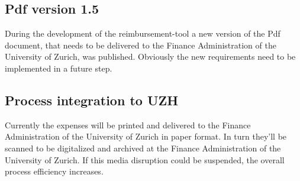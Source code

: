 \subsection{Pdf version 1.5}
During the development of the reimbursement-tool a new version of the Pdf document, that needs to be delivered to the Finance Administration of the University of Zurich, was published. Obviously the new requirements need to be implemented in a future step. 

\subsection{Process integration to UZH}
Currently the expenses will be printed and delivered to the Finance Administration of the University of Zurich in paper format. In turn they'll be scanned to be digitalized and archived at the Finance Administration of the University of Zurich. If this media disruption could be suspended, the overall process efficiency increases.

